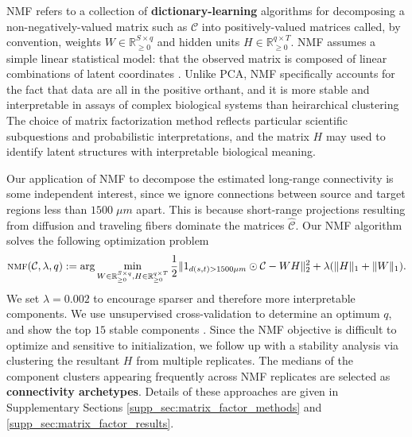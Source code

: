 NMF refers to a collection of \textbf{dictionary-learning} algorithms for decomposing a non-negatively-valued matrix such as $\mathcal C $ into positively-valued matrices called, by convention, weights $W \in \mathbb R^{S \times q}_{\geq 0}$ and hidden units $H \in \mathbb R^{q  \times T}_{\geq 0}$.
NMF assumes a simple linear statistical model: that the observed matrix is composed of linear combinations of latent coordinates \citep{Devarajan2008-hd}.
Unlike PCA, NMF specifically accounts for the fact that data are all in the positive orthant, and it is more stable and interpretable in assays of complex biological systems than heirarchical clustering \citep{Brunet2004-gi}
The choice of matrix factorization method reflects particular scientific subquestions and probabilistic interpretations, and the matrix $H$ may used to identify latent structures with interpretable biological meaning.

Our application of NMF to decompose the estimated long-range connectivity is some independent interest, since we ignore connections between source and target regions less than  $1500 \; \mu m$ apart.
This is because short-range projections resulting from diffusion and traveling fibers dominate the matrices $\hat {\mathcal C}$.
Our NMF algorithm solves the following optimization problem
\begin{eqnarray*}
\label{eq:nmf}
\textsc{nmf}(\mathcal C, \lambda, q) := \arg \min_{W\in \mathbb R^{S \times q}_{\geq 0}, H \in \mathbb R^{q  \times T}_{\geq 0}} \frac{1}{2}\| 1_{d(s,t) > 1500 \mu m} \odot \mathcal C - WH\|_2^2  + \lambda  (\|H \|_1 + \|W \|_1) .
\end{eqnarray*}
We set $\lambda = 0.002$ to encourage sparser and therefore more interpretable components.
We use unsupervised cross-validation to determine an optimum $q$, and show the top $15$ stable components \citep{Perry2009-ia}.
Since the NMF objective is difficult to optimize and sensitive to initialization, we follow up with a stability analysis via clustering the resultant $H$ from multiple replicates.
The medians of the component clusters appearing frequently across NMF replicates are selected as \textbf{connectivity archetypes}.
Details of these approaches are given in Supplementary Sections \ref{supp_sec:matrix_factor_methods} and \ref{supp_sec:matrix_factor_results}.